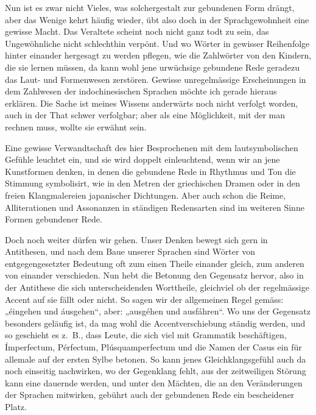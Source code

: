 {Nun ist es zwar nicht Vieles, was solchergestalt zur gebundenen Form drängt, aber das Wenige kehrt häufig wieder, übt also doch in der Sprachgewohnheit eine gewisse Macht. Das Veraltete scheint noch nicht ganz todt zu sein, das Ungewöhnliche nicht schlechthin verpönt. Und wo Wörter in gewisser Reihenfolge hinter einander hergesagt zu werden pflegen, wie die Zahlwörter von den Kindern, die sie lernen müssen, da kann wohl jene urwüchsige gebundene Rede geradezu das Laut- und Formenwesen zerstören. Gewisse unregelmässige Erschei\-\label{fp.225}nungen in dem Zahlwesen der indochinesischen Sprachen \label{sp.227} möchte ich gerade hieraus erklären. Die Sache ist meines Wissens anderwärts noch nicht verfolgt worden, auch in der That schwer verfolgbar; aber als eine Möglichkeit, mit der man rechnen muss, wollte sie erwähnt sein.

Eine gewisse Verwandtschaft des hier Besprochenen mit dem lautsymbolischen Gefühle leuchtet ein, und sie wird doppelt einleuchtend, wenn wir an jene Kunstformen denken, in denen die gebundene Rede in Rhythmus und Ton die Stimmung symbolisirt, wie in den Metren der griechischen Dramen oder in den freien Klangmalereien japanischer Dichtungen. Aber auch schon die Reime, Alliterationen und Assonanzen in ständigen Redensarten sind im weiteren Sinne Formen gebundener Rede.

Doch noch weiter dürfen wir gehen. Unser Denken bewegt sich gern in Antithesen, und nach dem Baue unserer Sprachen sind Wörter von entgegengesetzter Bedeutung oft zum einen Theile einander gleich, zum anderen von einander verschieden. Nun hebt die Betonung den Gegensatz hervor, also in der Antithese die sich unterscheidenden Worttheile, gleichviel ob der regelmässige Accent auf sie fällt oder nicht. So sagen wir der allgemeinen Regel gemäss: „éingehen und áusgehen“, aber: „ausgéhen und ausfáhren“. Wo uns der Gegensatz besonders geläufig ist, da mag wohl die Accentverschiebung ständig werden, und so geschieht es z.~B., dass Leute, die sich viel mit Grammatik beschäftigen, Ímperfectum, Pérfectum, Plúsquamperfectum und die Namen der Casus ein für allemale auf der ersten Sylbe betonen. So kann jenes Gleichklangsgefühl auch da noch einseitig nachwirken, wo der Gegenklang fehlt, aus der zeitweiligen Störung kann eine dauernde werden, und unter den Mächten, die an den Veränderungen der Sprachen mitwirken, gebührt auch der gebundenen Rede ein bescheidener Platz.

}
